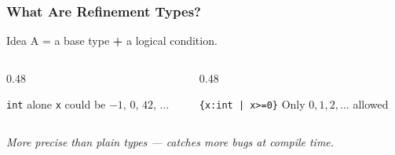 \begin{frame}
\frametitle{What Are Refinement Types?}
\begin{block}{Idea}
  A  = a base type \textbf{+} a logical condition.
\end{block}
\vspace{8pt}
\begin{center}
\end{center}
\vspace{6pt}
\begin{columns}[T]
\begin{column}{0.48\textwidth}
\begin{alertblock}{\texttt{int} alone}
  \texttt{x} could be $-1$, $0$, $42$, $\ldots$
\end{alertblock}
\end{column}
\begin{column}{0.48\textwidth}
\begin{exampleblock}{\texttt{\{x:int | x>=0\}}}
  Only $0, 1, 2, \ldots$ allowed
\end{exampleblock}
\end{column}
\end{columns}
\vspace{6pt}
\begin{center}
  \itshape More precise than plain types --- catches more bugs at compile time.
\end{center}
\end{frame}

